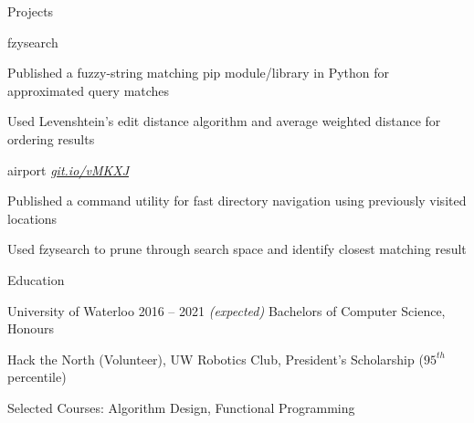 \documentclass{resume} %
\begin{document}
\begin{rSection}{Projects}
\begin{rSubsection}{fzysearch}
    \item Published a fuzzy-string matching pip module/library in
		 Python for approximated query matches
    \item Used Levenshtein's edit distance algorithm and average
		weighted distance for ordering results
  \end{rSubsection}
  
  \begin{rSubsection}{airport}
	  {\em{ \href{http://github.com/ridwanmsharif/airport}
		    {git.io/vMKXJ}}}
	  {}

    \item Published a command utility for fast directory navigation using
		previously visited locations
    \item Used fzysearch to prune through search space and identify closest
		matching result
  \end{rSubsection}
\end{rSection}


\begin{rSection}{Education}
  \begin{rSubsection}{University of Waterloo}
		     {2016 -- 2021 \em (expected)}
		     {Bachelors of Computer Science, Honours}
		     {}
    \item Hack the North (Volunteer), UW Robotics Club,
		President's Scholarship ($95^{th}$ percentile)
    \item Selected Courses: Algorithm Design, Functional Programming
  \end{rSubsection}
\end{rSection} 


\end{document}
